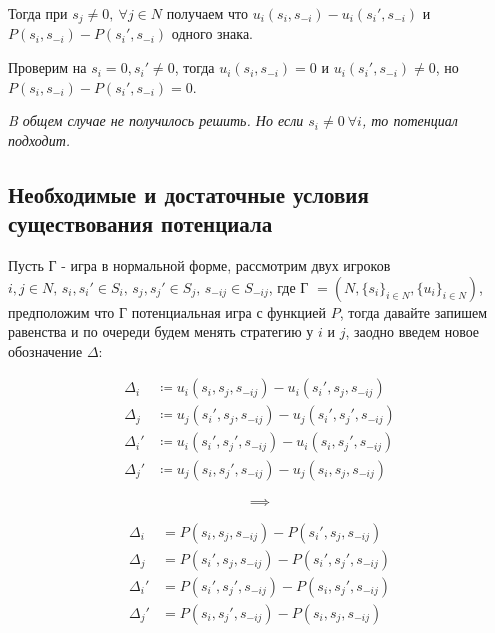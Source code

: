\begin{exmpl}
	Тогда при $s_j \neq 0, \ \forall j \in N$ получаем что  $u_i(s_i, s_{-i}) - u_i(s_i', s_{-i})$ и  $P(s_i, s_{-i}) - P(s_i', s_{-i})$ одного знака.

	Проверим на $s_i = 0, s_i' \neq 0$, тогда  $u_i(s_i, s_{-i}) = 0$ и  $u_i(s_i', s_{-i}) \neq 0$, но  $P(s_i, s_{-i}) - P(s_i', s_{-i}) = 0$.

	{\it  B общем случае не получилось решить. Но если $s_i \ne 0 \ \forall i$, то потенциал подходит.} 
\end{exmpl}

\subsection{Необходимые и достаточные условия существования потенциала}

Пусть Г - игра в нормальной форме, рассмотрим двух игроков $i, j \in N, \, s_i, s_i' \in S_i, \, s_j, s_j' \in S_j, \, s_{-ij} \in S_{-ij}$, где Г  $= (N, \{s_i\}_{i \in N}, \{u_i\}_{i \in N})$, предположим что Г потенциальная игра с функцией  $P$, тогда давайте запишем равенства и по очереди будем менять стратегию у $i$ и  $j$, заодно введем новое обозначение $\Delta$:

\begin{minipage}{.4\linewidth}
\begin{align*}
  \Delta_i &\coloneq u_i(s_i, s_j, s_{-ij}) - u_i(s_i', s_j, s_{-ij})  \\
  \Delta_j &\coloneq u_j(s_i', s_j, s_{-ij}) - u_j(s_i', s_j', s_{-ij})  \\
  \Delta_i' &\coloneq u_i(s_i', s_j', s_{-ij}) - u_i(s_i, s_j', s_{-ij}) \\
  \Delta_j' &\coloneq u_j(s_i, s_j', s_{-ij}) - u_j(s_i, s_j, s_{-ij})
\end{align*}
\end{minipage}
\begin{minipage}{.1\linewidth}
  \[\implies\]
\end{minipage}
\begin{minipage}{.4\linewidth}
  \begin{align*}
    \Delta_i &= P(s_i, s_j, s_{-ij}) - P(s_i', s_j, s_{-ij}) \\
    \Delta_j &= P(s_i', s_j, s_{-ij}) - P(s_i', s_j', s_{-ij}) \\ 
    \Delta_i' &= P(s_i', s_j', s_{-ij}) - P(s_i, s_j', s_{-ij}) \\
    \Delta_j' &= P(s_i, s_j', s_{-ij}) - P(s_i, s_j, s_{-ij})
  \end{align*}
\end{minipage}

